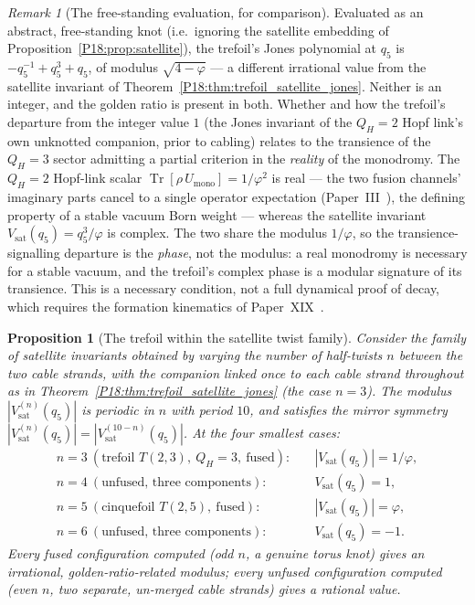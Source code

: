 \documentclass[11pt,a4paper]{article}
\newtheorem{proposition}[theorem]{Proposition}
\theoremstyle{definition}\newtheorem{definition}[theorem]{Definition}
\theoremstyle{remark}
\newtheorem{remark}[theorem]{Remark}
\newcommand{\vp}{\varphi}
\newcommand{\QH}{Q_H}
\newcommand{\Jones}{V}
\begin{document}
\begin{remark}[The free-standing evaluation, for comparison]
\label{P18:rem:trefoil_satellite_correction}
Evaluated as an abstract, free-standing knot (i.e.\ ignoring the
satellite embedding of Proposition~\ref{P18:prop:satellite}), the
trefoil's Jones polynomial at $q_5$ is $-q_5^{-1}+q_5^3+q_5$, of
modulus $\sqrt{4-\vp}$ --- a different irrational value from the
satellite invariant of Theorem~\ref{P18:thm:trefoil_satellite_jones}.
Neither is an integer, and the golden ratio is present in both.
Whether and how the trefoil's departure from the integer value $1$
(the Jones invariant of the $\QH=2$ Hopf link's own unknotted
companion, prior to cabling) relates to the transience of the
$\QH=3$ sector admitting a partial criterion in the \emph{reality} of the
monodromy.  The $\QH=2$ Hopf-link scalar
$\operatorname{Tr}[\rho\,U_{\mathrm{mono}}]=1/\vp^2$ is real --- the two
fusion channels' imaginary parts cancel to a single operator expectation
(Paper~III~\cite{Paper3}), the defining property of a stable vacuum Born
weight --- whereas the satellite invariant $\Jones_{\mathrm{sat}}(q_5)=
q_5^3/\vp$ is complex.  The two share the modulus $1/\vp$, so the
transience-signalling departure is the \emph{phase}, not the modulus: a
real monodromy is necessary for a stable vacuum, and the trefoil's complex
phase is a modular signature of its transience.  This is a necessary
condition, not a full dynamical proof of decay, which requires the
formation kinematics of Paper~XIX~\cite{Paper19}.
\end{remark}

\begin{proposition}[The trefoil within the satellite twist family]
\label{P18:prop:satellite_twist_family}
Consider the family of satellite invariants obtained by varying the
number of half-twists $n$ between the two cable strands, with the
companion linked once to each cable strand throughout as in
Theorem~\ref{P18:thm:trefoil_satellite_jones} (the case $n=3$).  The
modulus $|\Jones_{\mathrm{sat}}^{(n)}(q_5)|$ is periodic in $n$ with
period $10$, and satisfies the mirror symmetry
$|\Jones_{\mathrm{sat}}^{(n)}(q_5)|=|\Jones_{\mathrm{sat}}^{(10-n)}(q_5)|$.
At the four smallest cases:
\begin{align}
  n=3\ (\text{trefoil }T(2,3),\ \QH=3,\ \text{fused}):
    &\quad |\Jones_{\mathrm{sat}}(q_5)| = 1/\vp,
    \label{P18:eq:sat_n3}\\
  n=4\ (\text{unfused, three components}):
    &\quad \Jones_{\mathrm{sat}}(q_5) = 1,
    \label{P18:eq:sat_n4}\\
  n=5\ (\text{cinquefoil } T(2,5),\ \text{fused}):
    &\quad |\Jones_{\mathrm{sat}}(q_5)| = \vp,
    \label{P18:eq:sat_n5}\\
  n=6\ (\text{unfused, three components}):
    &\quad \Jones_{\mathrm{sat}}(q_5) = -1.
    \label{P18:eq:sat_n6}
\end{align}
Every fused configuration computed (odd $n$, a genuine torus knot)
gives an irrational, golden-ratio-related modulus; every unfused
configuration computed (even $n$, two separate, un-merged cable
strands) gives a rational value.
\end{proposition}
\end{document}
